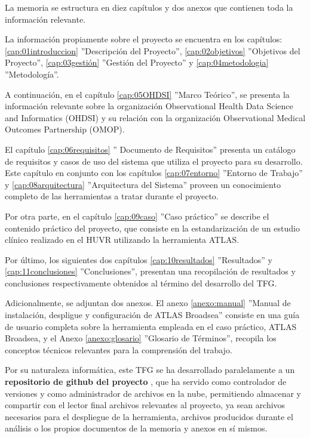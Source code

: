 La memoria se estructura en diez capítulos y dos anexos que contienen toda la información relevante.

La información propiamente sobre el proyecto se encuentra en los capítulos: \ref{cap:01introduccion} ''Descripción del Proyecto'',  \ref{cap:02objetivos} ''Objetivos del Proyecto'', \ref{cap:03gestión} ''Gestión del Proyecto'' y \ref{cap:04metodologia} ''Metodología''.

A continuación, en el capítulo \ref{cap:05OHDSI} ''Marco Teórico'', se presenta la información relevante sobre la organización Observational Health Data Science and Informatics (OHDSI) y su relación con la organización Observational Medical Outcomes Partnership (OMOP).

El capítulo \ref{cap:06requisitos} '' Documento de Requisitos'' presenta un catálogo de requisitos y casos de uso del sistema que utiliza el proyecto para su desarrollo. Este capítulo en conjunto con los capítulos \ref{cap:07entorno} ''Entorno de Trabajo'' y \ref{cap:08arquitectura} ''Arquitectura del Sistema'' proveen un conocimiento completo de las herramientas a tratar durante el proyecto. 

Por otra parte, en el capítulo \ref{cap:09caso} ''Caso práctico'' se describe el contenido práctico del proyecto, que consiste en la estandarización de un estudio clínico realizado en el HUVR utilizando la herramienta ATLAS. 

Por último, los siguientes dos capítulos \ref{cap:10resultados} ''Resultados'' y \ref{cap:11conclusiones} ''Conclusiones'', presentan una recopilación de resultados y conclusiones respectivamente obtenidos al término del desarrollo del TFG. 

Adicionalmente, se adjuntan dos anexos. El anexo \ref{anexo:manual} ''Manual de instalación, despligue y configuración de ATLAS Broadsea'' consiste en una guía de usuario completa sobre la herramienta empleada en el caso práctico, ATLAS Broadsea, y el Anexo \ref{anexo:glosario} ''Glosario de Términos'', recopila los conceptos técnicos relevantes para la comprensión del trabajo. 

Por su naturaleza informática, este TFG se ha desarrollado paralelamente a un \textbf{repositorio de github del proyecto} \parencite{vallealonsodc}, que ha servido como controlador de versiones y como administrador de archivos en la nube, permitiendo almacenar y compartir con el lector final archivos relevantes al proyecto, ya sean archivos necesarios para el despliegue de la herramienta, archivos producidos durante el análisis o los propios documentos de la memoria y anexos en sí mismos.
